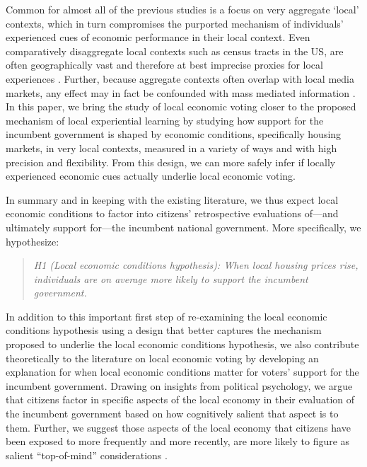 \documentclass[12pt,a4paper]{article}
\begin{document}
	Common for almost all of the previous studies is a focus on very aggregate `local’ contexts, which in turn compromises the purported mechanism of individuals’ experienced cues of economic performance in their local context. Even comparatively disaggregate local contexts such as census tracts in the US, are often geographically vast and therefore at best imprecise proxies for local experiences \citep{bisgaard2016reconsidering,dinesen2015ethnic}. Further, because aggregate contexts often overlap with local media markets, any effect may in fact be confounded with mass mediated information \citep{books1999contextual, reeves2012ecologies}. In this paper, we bring the study of local economic voting closer to the proposed mechanism of local experiential learning by studying how support for the incumbent government is shaped by economic conditions, specifically housing markets, in very local contexts, measured in a variety of ways and with high precision and flexibility. From this design, we can more safely infer if locally experienced economic cues actually underlie local economic voting.
	
	In summary and in keeping with the existing literature, we thus expect local economic conditions to factor into citizens’ retrospective evaluations of—and ultimately support for—the incumbent national government. More specifically, we hypothesize:
	\newcommand{\hone}{the local economic conditions hypothesis}
	\begin{quote}
		\textit{H1 (Local economic conditions hypothesis): When local housing prices rise, individuals are on average more likely to support the incumbent government.}
	\end{quote}
	
	In addition to this important first step of re-examining the local economic conditions hypothesis using a design that better captures the mechanism proposed to underlie the local economic conditions hypothesis, we also contribute theoretically to the literature on local economic voting by developing an explanation for when local economic conditions matter for voters’ support for the incumbent government. Drawing on insights from political psychology, we argue that citizens factor in specific aspects of the local economy in their evaluation of the incumbent government based on how cognitively salient that aspect is to them. Further, we suggest those aspects of the local economy that citizens have been exposed to more frequently and more recently, are more likely to figure as salient “top-of-mind” considerations \citep{zaller1992nature}. 
	
\end{document}
